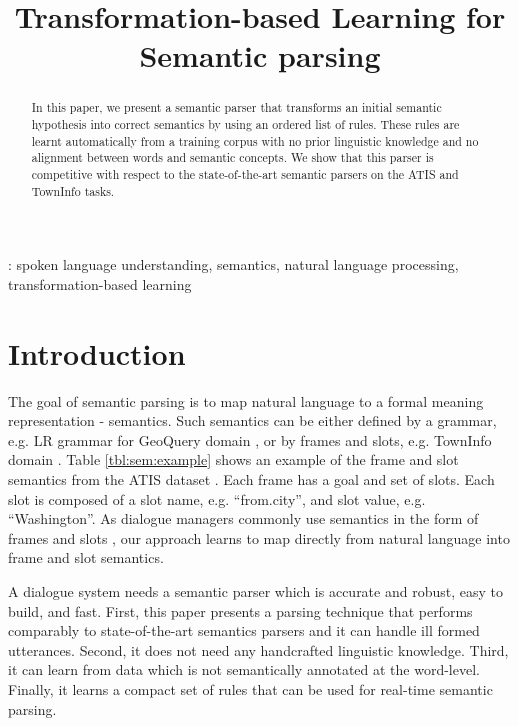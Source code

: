 \documentclass{article}
\title{Transformation-based Learning for Semantic parsing}
\begin{document}
\maketitle
%
\begin{abstract}
In this paper, we present a semantic parser that transforms an initial semantic hypothesis into correct semantics by using an ordered list of rules. These rules are learnt automatically from a training corpus with no prior linguistic knowledge and no alignment between words and semantic concepts. We show that this parser is competitive with respect to the state-of-the-art semantic parsers on the ATIS and TownInfo tasks.
\end{abstract}
\vspace{0.1cm}
: spoken language understanding, semantics, natural language processing, transformation-based learning


\section{Introduction}
The goal of semantic parsing is to map natural language to a formal meaning representation - semantics. Such semantics can be either defined by a grammar, e.g. LR grammar for GeoQuery domain \cite{kate05}, or by frames and slots, e.g. TownInfo domain \cite{mairesse09}. Table \ref{tbl:sem:example} shows an example of the frame and slot semantics from the ATIS dataset \cite{atis94}. Each frame has a goal and set of slots. Each slot is composed of a slot name, e.g. ``from.city'',
and slot value, e.g. ``Washington''. As dialogue managers commonly use semantics in the form of frames and slots \cite{williams07,thomson08}, our approach learns to map directly from natural language into frame and slot semantics.


A dialogue system needs a semantic parser which is accurate and robust, easy to build, and fast. First, this paper presents a parsing technique that performs comparably to state-of-the-art semantics parsers and it can handle ill formed utterances. Second, it does not need any handcrafted linguistic knowledge. Third, it can learn from data which is not semantically annotated at the word-level. Finally, it learns a compact set of rules that can be used for real-time semantic parsing.
\end{document}
